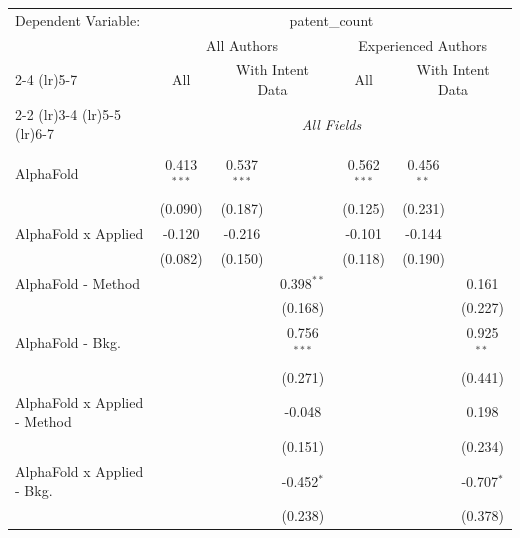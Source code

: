 \begingroup
\centering
\begin{tabular}{lcccccc}
   \tabularnewline \midrule \midrule
   Dependent Variable: & \multicolumn{6}{c}{patent\_count}\\
 & \multicolumn{3}{c}{All Authors} & \multicolumn{3}{c}{Experienced Authors} \\
\cmidrule(lr){2-4} \cmidrule(lr){5-7}
 & \multicolumn{1}{c}{All} & \multicolumn{2}{c}{With Intent Data} & \multicolumn{1}{c}{All} & \multicolumn{2}{c}{With Intent Data} \\
\cmidrule(lr){2-2} \cmidrule(lr){3-4} \cmidrule(lr){5-5} \cmidrule(lr){6-7}
 & \multicolumn{6}{c}{\textit{All Fields}} \\ \\
   AlphaFold                      & 0.413$^{***}$ & 0.537$^{***}$ &               & 0.562$^{***}$ & 0.456$^{**}$ &   \\   
                                  & (0.090)       & (0.187)       &               & (0.125)       & (0.231)      &   \\   
   AlphaFold x Applied            & -0.120        & -0.216        &               & -0.101        & -0.144       &   \\   
                                  & (0.082)       & (0.150)       &               & (0.118)       & (0.190)      &   \\   
   AlphaFold - Method             &               &               & 0.398$^{**}$  &               &              & 0.161\\   
                                  &               &               & (0.168)       &               &              & (0.227)\\   
   AlphaFold - Bkg.               &               &               & 0.756$^{***}$ &               &              & 0.925$^{**}$\\   
                                  &               &               & (0.271)       &               &              & (0.441)\\   
   AlphaFold x Applied - Method   &               &               & -0.048        &               &              & 0.198\\   
                                  &               &               & (0.151)       &               &              & (0.234)\\   
   AlphaFold x Applied - Bkg.     &               &               & -0.452$^{*}$  &               &              & -0.707$^{*}$\\   
                                  &               &               & (0.238)       &               &              & (0.378)\\   

\end{tabular}
